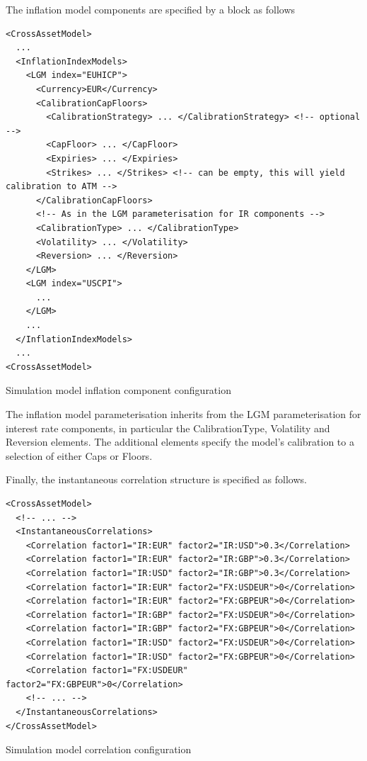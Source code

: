 \documentclass[12pt, a4paper]{article}
\begin{document}
\medskip
The inflation model components are specified by a block as follows

\begin{listing}[H]
\begin{verbatim}
<CrossAssetModel>	
  ...
  <InflationIndexModels>
    <LGM index="EUHICP">
      <Currency>EUR</Currency>
      <CalibrationCapFloors>
        <CalibrationStrategy> ... </CalibrationStrategy> <!-- optional -->
        <CapFloor> ... </CapFloor>
        <Expiries> ... </Expiries>
        <Strikes> ... </Strikes> <!-- can be empty, this will yield calibration to ATM -->
      </CalibrationCapFloors>
      <!-- As in the LGM parameterisation for IR components -->
      <CalibrationType> ... </CalibrationType>
      <Volatility> ... </Volatility>
      <Reversion> ... </Reversion> 
    </LGM>
    <LGM index="USCPI">
      ...
    </LGM>
    ...
  </InflationIndexModels>
  ...
<CrossAssetModel>	
\end{verbatim}
\caption{Simulation model inflation component configuration}
\label{lst:simulation_model_inflation_configuration}
\end{listing}

The inflation model parameterisation inherits from the LGM parameterisation for interest rate components, in particular the CalibrationType, Volatility and Reversion elements.  The additional elements specify the model's calibration to a selection of either Caps or Floors.


\medskip
Finally, the instantaneous correlation structure is specified as follows.

\begin{listing}[H]
\begin{verbatim}
<CrossAssetModel>	
  <!-- ... -->
  <InstantaneousCorrelations>
    <Correlation factor1="IR:EUR" factor2="IR:USD">0.3</Correlation>
    <Correlation factor1="IR:EUR" factor2="IR:GBP">0.3</Correlation>
    <Correlation factor1="IR:USD" factor2="IR:GBP">0.3</Correlation>
    <Correlation factor1="IR:EUR" factor2="FX:USDEUR">0</Correlation>
    <Correlation factor1="IR:EUR" factor2="FX:GBPEUR">0</Correlation>
    <Correlation factor1="IR:GBP" factor2="FX:USDEUR">0</Correlation>
    <Correlation factor1="IR:GBP" factor2="FX:GBPEUR">0</Correlation>
    <Correlation factor1="IR:USD" factor2="FX:USDEUR">0</Correlation>
    <Correlation factor1="IR:USD" factor2="FX:GBPEUR">0</Correlation>
    <Correlation factor1="FX:USDEUR" factor2="FX:GBPEUR">0</Correlation>
    <!-- ... --> 
  </InstantaneousCorrelations>
</CrossAssetModel>
\end{verbatim}
\caption{Simulation model correlation configuration}
\label{lst:simulation_model_correlation_configuration}
\end{listing}
\end{document}
